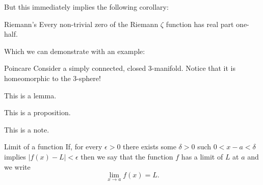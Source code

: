 \documentclass{MathNoteCN}
\begin{document}
	But this immediately implies the following corollary:
	\begin{corollary}{Riemann's}{}
		Every non-trivial zero of the Riemann $ \zeta $ function has real part one-half.
	\end{corollary}
	Which we can demonstrate with an example:
	\begin{example}{Poincare}{}
		Consider a simply connected, closed 3-manifold. Notice that it is homeomorphic to the 3-sphere!
	\end{example}
	\begin{lemma}
		This is a lemma.
	\end{lemma}
	\begin{proposition}
		This is a proposition.
	\end{proposition}
	\begin{note}
		This is a note.
	\end{note}
		\begin{definition}{Limit of a function}{}
	If, for every $ \epsilon >0 $ there exists some $ \delta >0 $ such $ 0<x-a<\delta $ implies $ |f(x)-L|<\epsilon $ then we say that the function $ f $ has a limit of $ L $ at $ a $ and we write
	\[\lim_{x\to a}f(x)=L.\]
	\end{definition}
\end{document}
